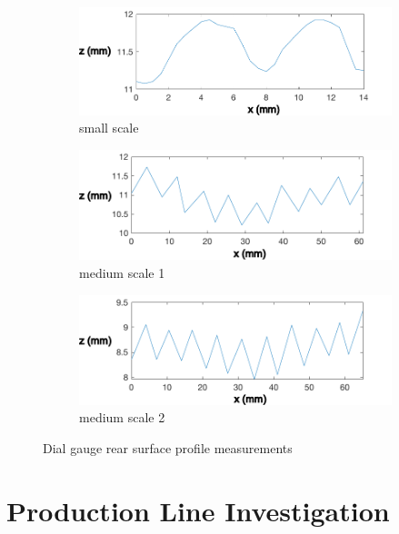 \documentclass[12pt]{report}
\begin{document}
\begin{figure}[ht]
    \begin{subfigure}{\textwidth}
        \centering
        \includegraphics[width=0.8\linewidth]{figures/initial_experiments/small_mechanical.pdf}  
        \caption{small scale}
        \label{fig:dial_gauge_s}
    \end{subfigure}
    \newline
    \begin{subfigure}{\textwidth}
        \centering
        \includegraphics[width=0.8\linewidth]{figures/initial_experiments/med_mechanical.pdf}  
        \caption{medium scale 1}
        \label{fig:dial_gauge_m1}
    \end{subfigure}
    \newline
    \begin{subfigure}{\textwidth}
        \centering
        \includegraphics[width=0.8\linewidth]{figures/initial_experiments/med_mechanical_2.pdf}  
        \caption{medium scale 2}
        \label{fig:dial_gauge_m2}
    \end{subfigure}
    \caption{Dial gauge rear surface profile measurements}
    \label{fig:dial_gauge}
\end{figure}

\chapter{Production Line Investigation}
\end{document}
